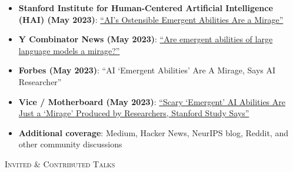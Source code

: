 \documentclass{article}
\newenvironment{changemargin}[2]{%
  \begin{list}{}{%
    \setlength{\topsep}{0pt}%
    \setlength{\leftmargin}{#1}%
    \setlength{\rightmargin}{#2}%
    \setlength{\listparindent}{\parindent}%
    \setlength{\itemindent}{\parindent}%
    \setlength{\parsep}{\parskip}%
  }%
  \item[]}{\end{list}
}
\newcommand{\lineover}{
	\begin{changemargin}{-0.05in}{-0.05in}
		\vspace*{-8pt}
		\hrulefill \\
		\vspace*{-2pt}
	\end{changemargin}
}
\newcommand{\header}[1]{
	\begin{changemargin}{-0.5in}{-0.5in}
		\scshape{#1}\\
  	\lineover
	\end{changemargin}
	\nopagebreak[4]    %
}
\newenvironment{body} {
		\vspace*{-16pt}
		\begin{changemargin}{-0.25in}{-0.5in}
	  }
		{\end{changemargin}\vspace{8pt plus 12pt}
	}
\begin{document}
\begin{body}
\begin{itemize}
    \item \textbf{Stanford Institute for Human-Centered Artificial Intelligence (HAI) (May 2023)}: \href{https://hai.stanford.edu/news/ais-ostensible-emergent-abilities-are-mirage}{``AI's Ostensible Emergent Abilities Are a Mirage''}
    \item \textbf{Y Combinator News (May 2023)}: \href{https://news.ycombinator.com/item?id=35768824}{``Are emergent abilities of large language models a mirage?''}
    \item \textbf{Forbes (May 2023)}: ``AI `Emergent Abilities' Are A Mirage, Says AI Researcher''
    \item \textbf{Vice / Motherboard (May 2023)}: \href{https://www.vice.com/en/article/scary-emergent-ai-abilities-are-just-a-mirage-produced-by-researchers-stanford-study-says/}{``Scary `Emergent' AI Abilities Are Just a `Mirage' Produced by Researchers, Stanford Study Says''}
    \item \textbf{Additional coverage}: Medium, Hacker News, NeurIPS blog, Reddit, and other community discussions
\end{itemize}
\end{body}


\header{Invited \& Contributed Talks}
\end{document}
